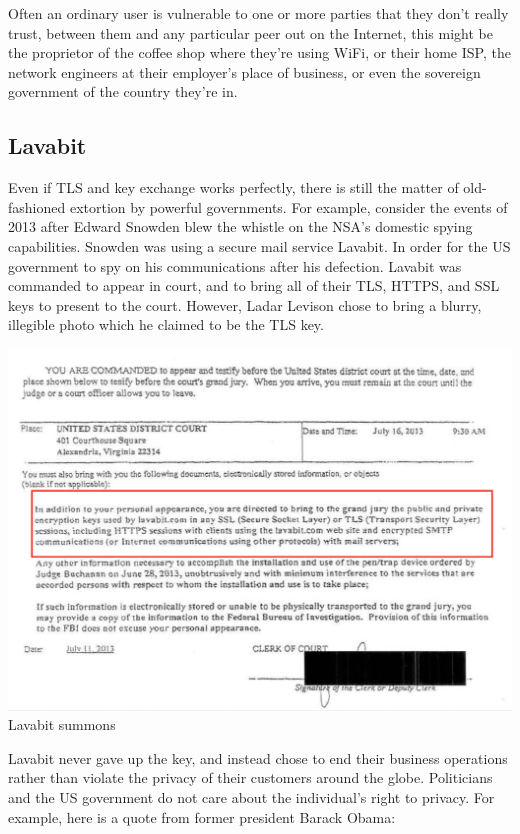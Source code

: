 \documentclass[11pt]{article} %
\begin{document}
\bigskip
Often an ordinary user is vulnerable to one or more parties that they don't 
really trust, between them and any particular peer out on the Internet, this 
might be the proprietor of the coffee shop where they're using WiFi, or their 
home ISP, the network engineers at their employer's place of business, or even 
the sovereign government of the country they're in.

\subsection{Lavabit}
Even if TLS and key exchange works perfectly, there is still the matter of old-fashioned extortion by powerful governments. For example, consider the events of 2013 after Edward Snowden blew the whistle on the NSA's domestic spying capabilities.
Snowden was using a secure mail service Lavabit. In order for the US government to spy on his communications after his defection. Lavabit was commanded to appear in court, and to bring all of their TLS, HTTPS, and SSL keys to present to the court. However, Ladar Levison chose to bring a blurry, illegible photo which he claimed to be the TLS key.
\begin{center}
\includegraphics[scale=.3]{./lavabit-summons.png}
\\Lavabit summons
\end{center}

Lavabit never gave up the key, and instead chose to end their business operations rather than violate the privacy of their customers around the globe. Politicians and the US government do not care about the individual's right to privacy. For example, here is a quote from former president Barack Obama:
\end{document}
